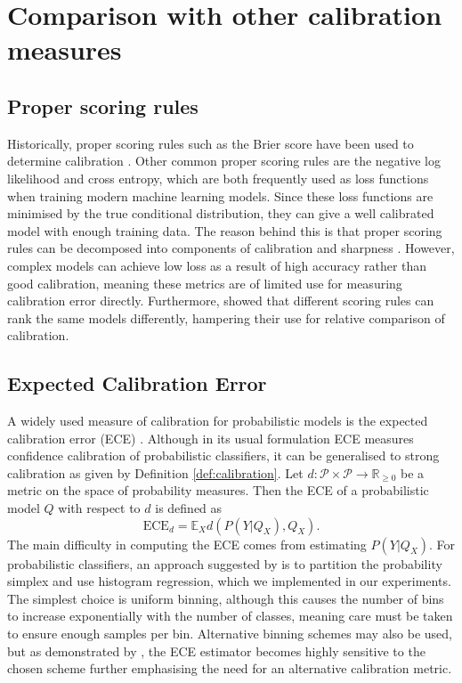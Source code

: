 \documentclass[twocolumn]{article}
\theoremstyle{definition}
\begin{document}
\section{Comparison with other calibration measures}

\subsection{Proper scoring rules}

Historically, proper scoring rules such as the Brier score have been used to determine calibration \citep{Brier_1950}. Other common proper scoring rules are the negative log likelihood and cross entropy, which are both frequently used as loss functions when training modern machine learning models. Since these loss functions are minimised by the true conditional distribution, they can give a well calibrated model with enough training data. The reason behind this is that proper scoring rules can be decomposed into components of calibration and sharpness \citep{Kull_Flach_2015}. However, complex models can achieve low loss as a result of high accuracy rather than good calibration, meaning these metrics are of limited use for measuring calibration error directly. Furthermore, \citet{Merkle_2013} showed that different scoring rules can rank the same models differently, hampering their use for relative comparison of calibration. 


\subsection{Expected Calibration Error}

A widely used measure of calibration for probabilistic models is the expected calibration error (ECE) \citep{naeini_2015}. Although in its usual formulation ECE measures confidence calibration of probabilistic classifiers, it can be generalised to strong calibration as given by Definition \ref{def:calibration}. Let $d: \mathcal{P} \times \mathcal{P} \to \mathbb{R}_{\geq 0}$ be a metric on the space of probability measures. Then the ECE of a probabilistic model $Q$ with respect to $d$ is defined as
\begin{equation}
    \text{ECE}_d = \mathbb{E}_X d(P(Y|Q_X), Q_X).
\end{equation}
The main difficulty in computing the ECE comes from estimating $P(Y|Q_X)$. For probabilistic classifiers, an approach suggested by \citet{vaicenavicius_2019} is to partition the probability simplex and use histogram regression, which we implemented in our experiments. The simplest choice is uniform binning, although this causes the number of bins to increase exponentially with the number of classes, meaning care must be taken to ensure enough samples per bin. Alternative binning schemes may also be used, but as demonstrated by \citet{vaicenavicius_2019}, the ECE estimator becomes highly sensitive to the chosen scheme further emphasising the need for an alternative calibration metric.
\end{document}
